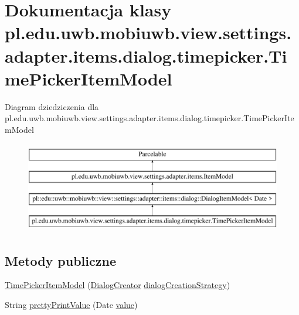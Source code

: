 \hypertarget{classpl_1_1edu_1_1uwb_1_1mobiuwb_1_1view_1_1settings_1_1adapter_1_1items_1_1dialog_1_1timepicker_1_1_time_picker_item_model}{}\section{Dokumentacja klasy pl.\+edu.\+uwb.\+mobiuwb.\+view.\+settings.\+adapter.\+items.\+dialog.\+timepicker.\+Time\+Picker\+Item\+Model}
\label{classpl_1_1edu_1_1uwb_1_1mobiuwb_1_1view_1_1settings_1_1adapter_1_1items_1_1dialog_1_1timepicker_1_1_time_picker_item_model}
Diagram dziedziczenia dla pl.\+edu.\+uwb.\+mobiuwb.\+view.\+settings.\+adapter.\+items.\+dialog.\+timepicker.\+Time\+Picker\+Item\+Model\begin{figure}[H]
\begin{center}
\leavevmode
\includegraphics[height=4.000000cm]{classpl_1_1edu_1_1uwb_1_1mobiuwb_1_1view_1_1settings_1_1adapter_1_1items_1_1dialog_1_1timepicker_1_1_time_picker_item_model}
\end{center}
\end{figure}
\subsection*{Metody publiczne}
\begin{DoxyCompactItemize}
\item 
\hyperlink{classpl_1_1edu_1_1uwb_1_1mobiuwb_1_1view_1_1settings_1_1adapter_1_1items_1_1dialog_1_1timepicker_1_1_time_picker_item_model_a3d674bbfe9a0080767d27e19413e769d}{Time\+Picker\+Item\+Model} (\hyperlink{classpl_1_1edu_1_1uwb_1_1mobiuwb_1_1controls_1_1dialogs_1_1_dialog_creator}{Dialog\+Creator} \hyperlink{classpl_1_1edu_1_1uwb_1_1mobiuwb_1_1view_1_1settings_1_1adapter_1_1items_1_1dialog_1_1_dialog_item_model_a69815392e79418b2ef8dec9eb184be44}{dialog\+Creation\+Strategy})
\item 
String \hyperlink{classpl_1_1edu_1_1uwb_1_1mobiuwb_1_1view_1_1settings_1_1adapter_1_1items_1_1dialog_1_1timepicker_1_1_time_picker_item_model_a38822cad1d6b1dfe1eabad6ebcc18af8}{pretty\+Print\+Value} (Date \hyperlink{classpl_1_1edu_1_1uwb_1_1mobiuwb_1_1view_1_1settings_1_1adapter_1_1items_1_1dialog_1_1_dialog_item_model_a6fc8d7f0a0759f12346fdd34666aaf39}{value})
\end{DoxyCompactItemize}
